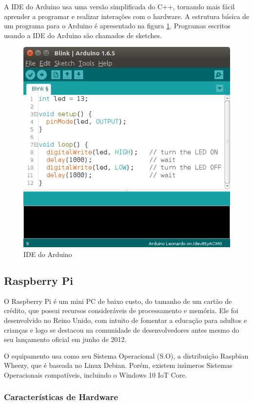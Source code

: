 A IDE do Arduino usa uma versão simplificada do C++\cite{arduino:ref},
tornando mais fácil aprender a programar e realizar interações com
o hardware. A estrutura básica de um programa para o Arduino é apresentado
na figura \ref{fig:arduino-1}. Programas escritos usando a IDE do
Arduino são chamados de sketches.

\begin{figure}[h]
\begin{centering}
\includegraphics[width=0.6\linewidth]{Imagens/Cap_2/arduinoide_sketch}
\par\end{centering}
\caption{IDE do Arduino \label{fig:arduino-1}}
\end{figure}


\subsection{Raspberry Pi\label{subsec:Raspberry-Pi}}

O Raspberry Pi\cite{url:raspberry} é um mini PC de baixo custo, do
tamanho de um cartão de crédito, que possui recursos consideráveis
de processamento e memória. Ele foi desenvolvido no Reino Unido, com
intuito de fomentar a educação para adultos e crianças e logo se destacou
na comunidade de desenvolvedores antes mesmo do seu lançamento oficial
em junho de 2012.

O equipamento usa como seu Sistema Operacional (S.O), a distribuição
Raspbian Wheezy, que é baseada no Linux Debian. Porém, existem inúmeros
Sistemas Operacionais compatíveis\cite{raspberry:compatible}, incluindo
o Windows 10 IoT Core\cite{raspberry:compatible1}. 


\subsubsection{Características de Hardware}

